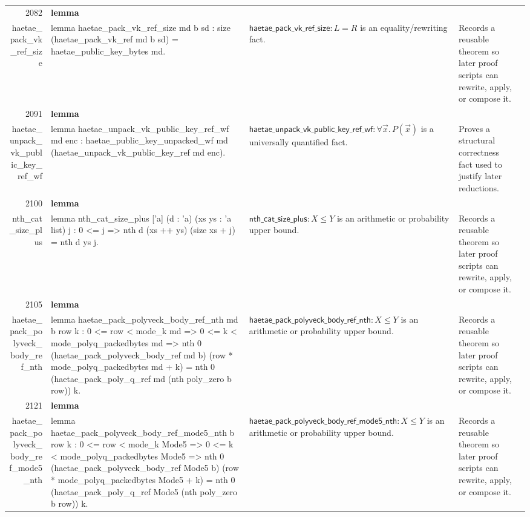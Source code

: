\documentclass[10pt]{article}
\newcommand{\ec}[1]{\begingroup\ttfamily\scriptsize #1\endgroup}
\begin{document}
\begin{longtable}{r L{0.17\textwidth} L{0.26\textwidth} L{0.27\textwidth} L{0.20\textwidth}}
2082 & \textbf{lemma}\\\ec{haetae\_pack\_vk\_ref\_size} & \ec{lemma haetae\_pack\_vk\_ref\_size md b sd : size (haetae\_pack\_vk\_ref md b sd) = haetae\_public\_key\_bytes md.} & \(\mathsf{haetae\_pack\_vk\_ref\_size} : L = R\) is an equality/rewriting fact. & Records a reusable theorem so later proof scripts can rewrite, apply, or compose it. \\
2091 & \textbf{lemma}\\\ec{haetae\_unpack\_vk\_public\_key\_ref\_wf} & \ec{lemma haetae\_unpack\_vk\_public\_key\_ref\_wf md enc : haetae\_public\_key\_unpacked\_wf md (haetae\_unpack\_vk\_public\_key\_ref md enc).} & \(\mathsf{haetae\_unpack\_vk\_public\_key\_ref\_wf} : \forall \vec{x}.\, P(\vec{x})\) is a universally quantified fact. & Proves a structural correctness fact used to justify later reductions. \\
2100 & \textbf{lemma}\\\ec{nth\_cat\_size\_plus} & \ec{lemma nth\_cat\_size\_plus ['a] (d : 'a) (xs ys : 'a list) j : 0 <= j => nth d (xs ++ ys) (size xs + j) = nth d ys j.} & \(\mathsf{nth\_cat\_size\_plus} : X \le Y\) is an arithmetic or probability upper bound. & Records a reusable theorem so later proof scripts can rewrite, apply, or compose it. \\
2105 & \textbf{lemma}\\\ec{haetae\_pack\_polyveck\_body\_ref\_nth} & \ec{lemma haetae\_pack\_polyveck\_body\_ref\_nth md b row k : 0 <= row < mode\_k md => 0 <= k < mode\_polyq\_packedbytes md => nth 0 (haetae\_pack\_polyveck\_body\_ref md b) (row * mode\_polyq\_packedbytes md + k) = nth 0 (haetae\_pack\_poly\_q\_ref md (nth poly\_zero b row)) k.} & \(\mathsf{haetae\_pack\_polyveck\_body\_ref\_nth} : X \le Y\) is an arithmetic or probability upper bound. & Records a reusable theorem so later proof scripts can rewrite, apply, or compose it. \\
2121 & \textbf{lemma}\\\ec{haetae\_pack\_polyveck\_body\_ref\_mode5\_nth} & \ec{lemma haetae\_pack\_polyveck\_body\_ref\_mode5\_nth b row k : 0 <= row < mode\_k Mode5 => 0 <= k < mode\_polyq\_packedbytes Mode5 => nth 0 (haetae\_pack\_polyveck\_body\_ref Mode5 b) (row * mode\_polyq\_packedbytes Mode5 + k) = nth 0 (haetae\_pack\_poly\_q\_ref Mode5 (nth poly\_zero b row)) k.} & \(\mathsf{haetae\_pack\_polyveck\_body\_ref\_mode5\_nth} : X \le Y\) is an arithmetic or probability upper bound. & Records a reusable theorem so later proof scripts can rewrite, apply, or compose it. \\

\end{longtable}
\end{document}
